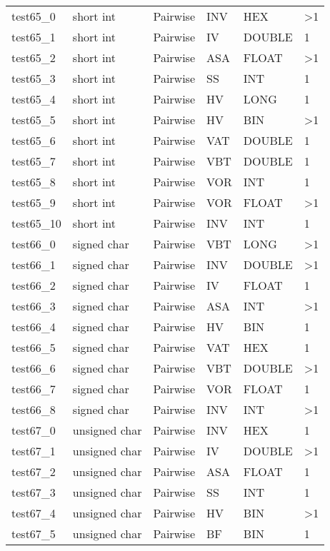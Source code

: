 \begin{longtable}{|l|l|l|l|l|l|}
test65\_0 & short int & Pairwise & INV & HEX & \textgreater{}1 \\
test65\_1 & short int & Pairwise & IV & DOUBLE & 1 \\
test65\_2 & short int & Pairwise & ASA & FLOAT & \textgreater{}1 \\
test65\_3 & short int & Pairwise & SS & INT & 1 \\
test65\_4 & short int & Pairwise & HV & LONG & 1 \\
test65\_5 & short int & Pairwise & HV & BIN & \textgreater{}1 \\
test65\_6 & short int & Pairwise & VAT & DOUBLE & 1 \\
test65\_7 & short int & Pairwise & VBT & DOUBLE & 1 \\
test65\_8 & short int & Pairwise & VOR & INT & 1 \\
test65\_9 & short int & Pairwise & VOR & FLOAT & \textgreater{}1 \\
test65\_10 & short int & Pairwise & INV & INT & 1 \\
test66\_0 & signed char & Pairwise & VBT & LONG & \textgreater{}1 \\
test66\_1 & signed char & Pairwise & INV & DOUBLE & \textgreater{}1 \\
test66\_2 & signed char & Pairwise & IV & FLOAT & 1 \\
test66\_3 & signed char & Pairwise & ASA & INT & \textgreater{}1 \\
test66\_4 & signed char & Pairwise & HV & BIN & 1 \\
test66\_5 & signed char & Pairwise & VAT & HEX & 1 \\
test66\_6 & signed char & Pairwise & VBT & DOUBLE & \textgreater{}1 \\
test66\_7 & signed char & Pairwise & VOR & FLOAT & 1 \\
test66\_8 & signed char & Pairwise & INV & INT & \textgreater{}1 \\
test67\_0 & unsigned char & Pairwise & INV & HEX & 1 \\
test67\_1 & unsigned char & Pairwise & IV & DOUBLE & \textgreater{}1 \\
test67\_2 & unsigned char & Pairwise & ASA & FLOAT & 1 \\
test67\_3 & unsigned char & Pairwise & SS & INT & 1 \\
test67\_4 & unsigned char & Pairwise & HV & BIN & \textgreater{}1 \\
test67\_5 & unsigned char & Pairwise & BF & BIN & 1 \\

\end{longtable}
